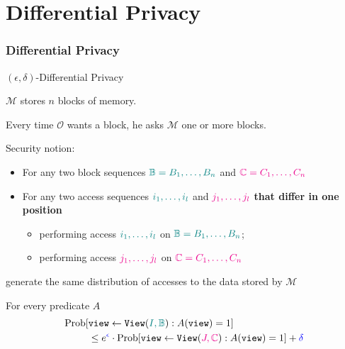 \documentclass[]{beamer}
\newcommand{\owner}{\mathcal{O}}
\newcommand{\manager}{\mathcal{M}}
\begin{document}
\section{Differential Privacy}
\begin{frame}[label=dp]
\frametitle{Differential Privacy \hfill \hyperlink{GO<2>}{}}

\begin{block}{$(\epsilon,\delta)$-Differential Privacy}
\begin{itemize}
\item {\color{blue} $\manager$ stores $n$ blocks of memory.}
\item {\color{blue} Every time $\owner$ wants a block, he asks $\manager$ one or more blocks.}

{\color{olive}
\item Security notion:
\begin{itemize}
\color{olive}
\item For any two block sequences $\color{teal} \mathbb{B}=B_1,\ldots,B_n$ and 
                                    $\color{magenta} \mathbb{C}=C_1,\ldots,C_n$
\item For any two access sequences $\color{teal}    i_1,\ldots,i_l$ and 
                                   $\color{magenta} j_1,\ldots,j_l$
{\color{blue}\bf that differ in one position}
\begin{itemize}
\color{olive}
    \item performing access $\color{teal}    i_1,\ldots,i_l$ on
                $\color{teal} \mathbb{B}=B_1,\ldots,B_n$;
    \item performing access $\color{magenta} j_1,\ldots,j_l$ on
                $\color{magenta} \mathbb{C}=C_1,\ldots,C_n$
\end{itemize}
\end{itemize}
    generate the same distribution of accesses to the data stored by $\manager$
}
\end{itemize}
\end{block}
\pause
For every predicate $A$
\begin{align*}
\text{\rm Prob}[&\mathtt{view}\leftarrow\mathtt{View}({\color{teal}I,\mathbb{B}}):
    A(\mathtt{view})=1]\\ & \leq e^{\color{blue} \epsilon}\cdot
  \text{\rm Prob}[\mathtt{view}\leftarrow\mathtt{View}({\color{magenta}J,\mathbb{C}}):
    A(\mathtt{view})=1]+{\color{blue} \delta}
\end{align*}
\end{frame}
\end{document}
